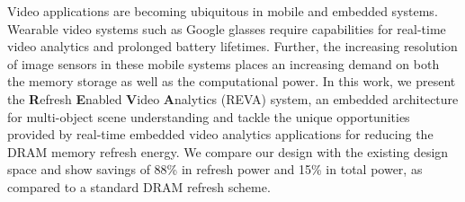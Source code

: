 Video applications are becoming ubiquitous in mobile and embedded systems. Wearable video systems such as Google glasses require capabilities for real-time video analytics and prolonged battery lifetimes. Further, the increasing resolution of image sensors in these mobile systems places an increasing demand on both the memory storage as well as the computational power. In this work, we present the \textbf{R}efresh \textbf{E}nabled \textbf{V}ideo \textbf{A}nalytics (REVA) system, an embedded architecture for multi-object scene understanding and tackle the unique opportunities provided by real-time embedded video analytics applications for reducing the DRAM memory refresh energy. We compare our design with the existing design space and show savings of 88\% in refresh power and 15\% in total power, as compared to a standard DRAM refresh scheme. 
